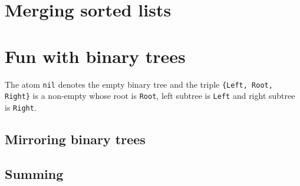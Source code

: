 \documentclass[11pt,a4paper]{article}
\author{Christian Rinderknecht}
\date{14 June 2007}
\begin{document}
\maketitle

\thispagestyle{empty}

\section{Merging sorted lists}



\section{Fun with binary trees}

The atom \texttt{nil} denotes the empty binary tree and the triple
\texttt{\{Left, Root, Right\}} is a non\hyp{}empty whose root is
\texttt{Root}, left subtree is \texttt{Left} and right subtree is
\texttt{Right}.

\subsection{Mirroring binary trees}



\subsection{Summing}


\end{document}
